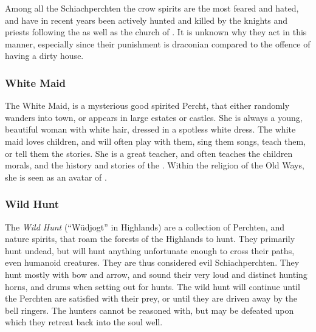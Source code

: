 Among all the Schiachperchten the crow spirits are the most feared and hated,
and have in recent years been actively hunted and killed by the knights and
priests following the  as well as the church of
. It is unknown why they act in this manner, especially since
their punishment is draconian compared to the offence of having a dirty house.

\subsubsection{White Maid}
\label{sec:White Maid}

The White Maid, is a mysterious good spirited Percht, that either randomly
wanders into town, or appears in large estates or castles. She is always a
young, beautiful woman with white hair, dressed in a spotless white dress. The
white maid loves children, and will often play with them, sing them songs,
teach them, or tell them the stories. She is a great teacher, and often
teaches the children morals, and the history and stories of the
. Within the religion of the Old Ways, she is seen as an
avatar of .

\subsubsection{Wild Hunt}
\label{sec:Wild Hunt}

The \emph{Wild Hunt} (``Wüdjogt'' in Highlands) are a collection of Perchten,
and nature spirits, that roam the forests of the Highlands to hunt. They
primarily hunt undead, but will hunt anything unfortunate enough to cross
their paths, even humanoid creatures. They are thus considered evil
Schiachperchten. They hunt mostly with bow and arrow, and sound their very loud
and distinct hunting horns, and drums when setting out for hunts. The wild hunt
will continue until the Perchten are satisfied with their prey, or until they
are driven away by the bell ringers. The hunters cannot be reasoned with, but
may be defeated upon which they retreat back into the soul well.
